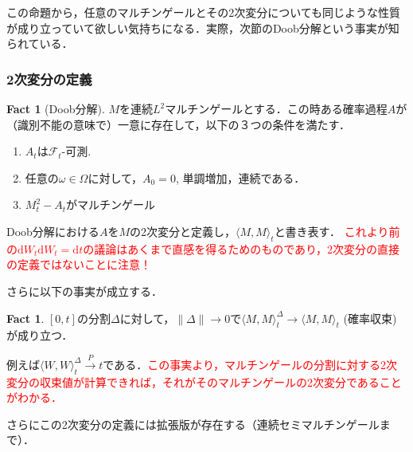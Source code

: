 \documentclass{jsarticle}
\theoremstyle{definition}
\newtheorem{fact}[dfn]{Fact}
\begin{document}
この命題から，任意のマルチンゲールとその2次変分についても同じような性質が成り立っていて欲しい気持ちになる．実際，次節のDoob分解という事実が知られている．

\subsubsection{2次変分の定義}
\begin{fact}[Doob分解]
    $M$を連続$L^2$マルチンゲールとする．この時ある確率過程$A$が（識別不能の意味で）一意に存在して，以下の３つの条件を満たす．
    \begin{enumerate}
        \item $A_t$は$\mathscr{F}_t$-可測.
        \item 任意の$\omega\in\Omega$に対して，$A_0 = 0$, 単調増加，連続である．
        \item $M_t^2 - A_t$がマルチンゲール
    \end{enumerate}
\end{fact}
Doob分解における$A$を$M$の2次変分と定義し，$\langle M, M\rangle_t$と書き表す．
\textcolor{red}{これより前の$\mathrm{d}W_t\mathrm{d}W_t=\mathrm{d}t$の議論はあくまで直感を得るためのものであり，2次変分の直接の定義ではないことに注意！}

さらに以下の事実が成立する．
\begin{fact}
    $[0, t]$の分割$\Delta$に対して，$\|\Delta\|\rightarrow 0$で$\langle M, M\rangle_t^{\Delta} \rightarrow \langle M, M\rangle_t$ (確率収束)が成り立つ．
\end{fact}
例えば$\langle W, W\rangle_t^{\Delta} \overset{P}{\rightarrow} t$である．\textcolor{red}{この事実より，マルチンゲールの分割に対する2次変分の収束値が計算できれば，それがそのマルチンゲールの2次変分であることがわかる．}

さらにこの2次変分の定義には拡張版が存在する（連続セミマルチンゲールまで）．
\end{document}
